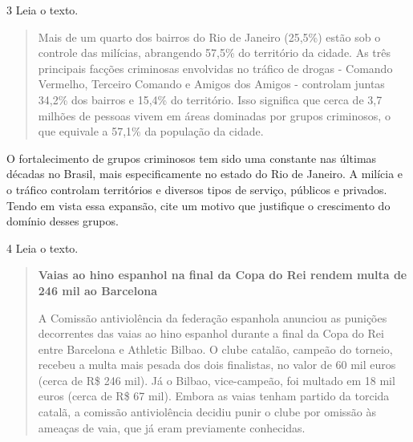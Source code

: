 \num{3} Leia o texto.

\begin{quote}
Mais de um quarto dos bairros do Rio de Janeiro (25,5\%) estão sob o
controle das milícias, abrangendo 57,5\% do território da cidade. As
três principais facções criminosas envolvidas no tráfico de drogas -
Comando Vermelho, Terceiro Comando e Amigos dos Amigos - controlam
juntas 34,2\% dos bairros e 15,4\% do território. Isso significa que
cerca de 3,7 milhões de pessoas vivem em áreas dominadas por grupos
criminosos, o que equivale a 57,1\% da população da cidade.

\end{quote}

O fortalecimento de grupos criminosos tem sido uma constante nas últimas
décadas no Brasil, mais especificamente no estado do Rio de Janeiro. A
milícia e o tráfico controlam territórios e diversos tipos de serviço,
públicos e privados. Tendo em vista essa expansão, cite um motivo que
justifique o crescimento do domínio desses grupos.


\num{4} Leia o texto.

\begin{quote}
\textbf{Vaias ao hino espanhol na final da Copa do Rei rendem multa de 246 mil ao Barcelona}

A Comissão antiviolência da federação espanhola anunciou as punições
decorrentes das vaias ao hino espanhol durante a final da Copa do Rei
entre Barcelona e Athletic Bilbao. O clube catalão, campeão do torneio,
recebeu a multa mais pesada dos dois finalistas, no valor de 60 mil
euros (cerca de R\$ 246 mil). Já o Bilbao, vice-campeão, foi multado em
18 mil euros (cerca de R\$ 67 mil). Embora as vaias tenham partido da
torcida catalã, a comissão antiviolência decidiu punir o clube por
omissão às ameaças de vaia, que já eram previamente conhecidas.

\end{quote}

